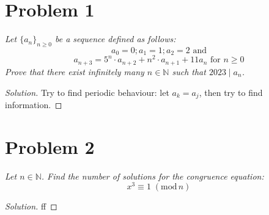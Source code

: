 \documentclass{article}
\newcommand{\N}{{\mathbb N}}
\begin{document}
\section{Problem 1}
{\it Let $\{a_n\}_{n\geq 0}$ be a sequence defined as follows:
\[
	a_0 = 0; a_1 = 1; a_2 = 2 \text{ and}
\]
\[
	a_{n+3} = 5^n\cdot a_{n+2} + n^2\cdot a_{n+1} + 11a_n
	\text{ for }n\geq 0
\]
Prove that there exist infinitely many $n \in \N$
such that $2023 \mid a_n$.
}
\begin{proof}[Solution]\let\qed\relax
	Try to find periodic behaviour: let $a_k = a_j$,
	then try to find information.
\end{proof}
\clearpage

\section{Problem 2}
{\it Let $n \in \N$.
Find the number of solutions for the congruence equation:
\[
	x^3 \equiv 1 \; (\mathrm{mod}\, n)
\]
}
\begin{proof}[Solution]\let\qed\relax
	ff
\end{proof}
\clearpage
\end{document}
